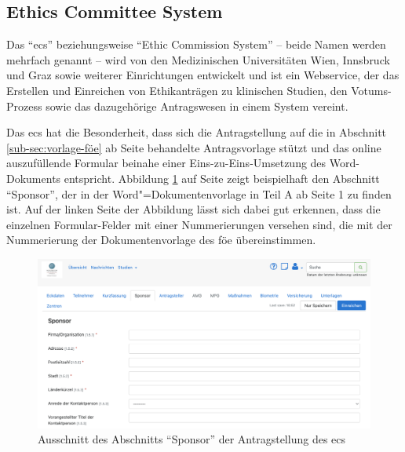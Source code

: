 \documentclass[a4paper,12pt,twoside,numbers=noendperiod]{scrreprt}
\begin{document}
\subsection{Ethics Committee System}
\label{sub-sec:ecs}

Das \enquote{\ac{ecs}} beziehungsweise \enquote{Ethic Commission System} -- beide Namen werden mehrfach genannt -- wird von den Medizinischen Universitäten Wien, Innsbruck und Graz sowie weiterer Einrichtungen entwickelt und ist ein Webservice, der das Erstellen und Einreichen von Ethikanträgen zu klinischen Studien, den Votums-Prozess sowie das dazugehörige Antragswesen in einem System vereint. \cite{medizinische_universitat_wien_ecs-docs_about-2021}

\medskip

Das \ac{ecs} hat die Besonderheit, dass sich die Antragstellung auf die in Abschnitt \ref{sub-sec:vorlage-föe} ab Seite \pageref{sub-sec:vorlage-föe} behandelte Antragsvorlage stützt und das online auszufüllende Formular beinahe einer Eins-zu-Eins-Umsetzung des Word-Dokuments entspricht. Abbildung \ref{fig:abschnitt-sponsor-ecs} auf Seite \pageref{fig:abschnitt-sponsor-ecs} zeigt beispielhaft den Abschnitt \enquote{Sponsor}, der in der Word"=Dokumentenvorlage in Teil A ab Seite 1 zu finden ist. Auf der linken Seite der Abbildung lässt sich dabei gut erkennen, dass die einzelnen Formular-Felder mit einer Nummerierungen versehen sind, die mit der Nummerierung der Dokumentenvorlage des \ac{föe} übereinstimmen.

\begin{figure}[ht]
    \centering
    \includegraphics[width=\linewidth]{thesis/images/Luidold_ECS-Schritt-Eckdaten.png}
    \caption[Ausschnitt des Abschnitts \enquote{Sponsor} der Antragstellung des \acl{ecs}]{Ausschnitt des Abschnitts \enquote{Sponsor} der Antragstellung des \acl{ecs} \cite{ethikkommission_der_medizinischen_universitat_innsbruck_ethikkommission_2023}}
    \label{fig:abschnitt-sponsor-ecs}
\end{figure}
\end{document}
